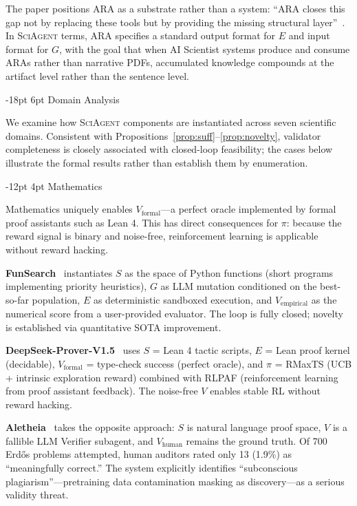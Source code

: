 \documentclass[11pt]{article}
\makeatletter
\renewcommand\section{\@startsection{section}{1}{\z@}%
  {-18pt \@plus -4pt \@minus -2pt}%
  {6pt \@plus 2pt}%
  {\normalfont\large\bfseries}}
\renewcommand\subsection{\@startsection{subsection}{2}{\z@}%
  {-12pt \@plus -2pt \@minus -2pt}%
  {4pt \@plus 1pt}%
  {\normalfont\normalsize\bfseries}}
\newcommand{\framework}{\textsc{SciAgent}}
\makeatother
\begin{document}
The paper positions ARA as a substrate rather than a system: ``ARA closes this gap not by replacing these tools but by providing the missing structural layer''~\citep{liu2026lasthuman}. In \framework{} terms, ARA specifies a standard output format for $E$ and input format for $G$, with the goal that when AI Scientist systems produce and consume ARAs rather than narrative PDFs, accumulated knowledge compounds at the artifact level rather than the sentence level.

\section{Domain Analysis}
\label{sec:domains}

We examine how \framework{} components are instantiated across seven scientific domains. Consistent with Propositions~\ref{prop:suff}--\ref{prop:novelty}, validator completeness is closely associated with closed-loop feasibility; the cases below illustrate the formal results rather than establish them by enumeration.

\subsection{Mathematics}

Mathematics uniquely enables $V_\text{formal}$---a perfect oracle implemented by formal proof assistants such as Lean 4. This has direct consequences for $\pi$: because the reward signal is binary and noise-free, reinforcement learning is applicable without reward hacking.

\textbf{FunSearch}~\citep{romera2023funsearch} instantiates $S$ as the space of Python functions (short programs implementing priority heuristics), $G$ as LLM mutation conditioned on the best-so-far population, $E$ as deterministic sandboxed execution, and $V_\text{empirical}$ as the numerical score from a user-provided evaluator. The loop is fully closed; novelty is established via quantitative SOTA improvement.

\textbf{DeepSeek-Prover-V1.5}~\citep{xin2024deepseek} uses $S$ = Lean 4 tactic scripts, $E$ = Lean proof kernel (decidable), $V_\text{formal}$ = type-check success (perfect oracle), and $\pi$ = RMaxTS (UCB + intrinsic exploration reward) combined with RLPAF (reinforcement learning from proof assistant feedback). The noise-free $V$ enables stable RL without reward hacking.

\textbf{Aletheia}~\citep{google2026aletheia} takes the opposite approach: $S$ is natural language proof space, $V$ is a fallible LLM Verifier subagent, and $V_\text{human}$ remains the ground truth. Of 700 Erd\H{o}s problems attempted, human auditors rated only 13 (1.9\%) as ``meaningfully correct.'' The system explicitly identifies ``subconscious plagiarism''---pretraining data contamination masking as discovery---as a serious validity threat.
\end{document}

